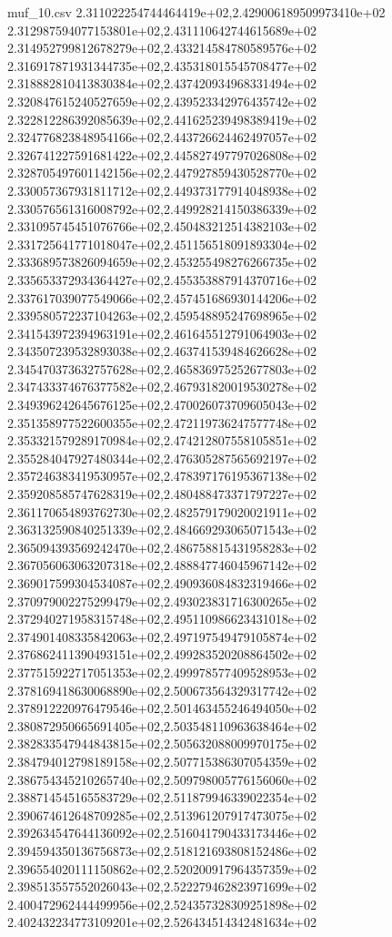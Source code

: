 \begin{filecontents*}{muf_10.csv}
2.311022254744464419e+02,2.429006189509973410e+02
2.312987594077153801e+02,2.431110642744615689e+02
2.314952799812678279e+02,2.433214584780589576e+02
2.316917871931344735e+02,2.435318015545708477e+02
2.318882810413830384e+02,2.437420934968331494e+02
2.320847615240527659e+02,2.439523342976435742e+02
2.322812286392085639e+02,2.441625239498389419e+02
2.324776823848954166e+02,2.443726624462497057e+02
2.326741227591681422e+02,2.445827497797026808e+02
2.328705497601142156e+02,2.447927859430528770e+02
2.330057367931811712e+02,2.449373177914048938e+02
2.330576561316008792e+02,2.449928214150386339e+02
2.331095745451076766e+02,2.450483212514382103e+02
2.331725641771018047e+02,2.451156518091893304e+02
2.333689573826094659e+02,2.453255498276266735e+02
2.335653372934364427e+02,2.455353887914370716e+02
2.337617039077549066e+02,2.457451686930144206e+02
2.339580572237104263e+02,2.459548895247698965e+02
2.341543972394963191e+02,2.461645512791064903e+02
2.343507239532893038e+02,2.463741539484626628e+02
2.345470373632757628e+02,2.465836975252677803e+02
2.347433374676377582e+02,2.467931820019530278e+02
2.349396242645676125e+02,2.470026073709605043e+02
2.351358977522600355e+02,2.472119736247577748e+02
2.353321579289170984e+02,2.474212807558105851e+02
2.355284047927480344e+02,2.476305287565692197e+02
2.357246383419530957e+02,2.478397176195367138e+02
2.359208585747628319e+02,2.480488473371797227e+02
2.361170654893762730e+02,2.482579179020021911e+02
2.363132590840251339e+02,2.484669293065071543e+02
2.365094393569242470e+02,2.486758815431958283e+02
2.367056063063207318e+02,2.488847746045967142e+02
2.369017599304534087e+02,2.490936084832319466e+02
2.370979002275299479e+02,2.493023831716300265e+02
2.372940271958315748e+02,2.495110986623431018e+02
2.374901408335842063e+02,2.497197549479105874e+02
2.376862411390493151e+02,2.499283520208864502e+02
2.377515922717051353e+02,2.499978577409528953e+02
2.378169418630068890e+02,2.500673564329317742e+02
2.378912220976479546e+02,2.501463455246494050e+02
2.380872950665691405e+02,2.503548110963638464e+02
2.382833547944843815e+02,2.505632088009970175e+02
2.384794012798189158e+02,2.507715386307054359e+02
2.386754345210265740e+02,2.509798005776156060e+02
2.388714545165583729e+02,2.511879946339022354e+02
2.390674612648709285e+02,2.513961207917473075e+02
2.392634547644136092e+02,2.516041790433173446e+02
2.394594350136756873e+02,2.518121693808152486e+02
2.396554020111150862e+02,2.520200917964357359e+02
2.398513557552026043e+02,2.522279462823971699e+02
2.400472962444499956e+02,2.524357328309251898e+02
2.402432234773109201e+02,2.526434514342481634e+02

\end{filecontents*}
